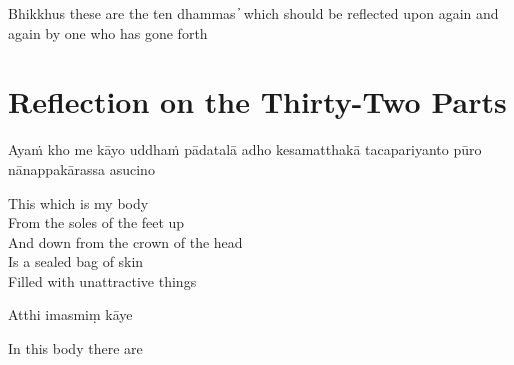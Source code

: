 \begin{english}
Bhikkhus these are the ten dhammas  ̓  which should be reflected upon again and again by one who has gone forth
\end{english}


\clearpage

\section{Reflection on the Thirty-Two Parts}

\begin{leader}
\end{leader}

Ayaṁ kho me kāyo uddhaṁ pādatalā adho kesamatthakā tacapariyanto pūro nānappakārassa asucino

\begin{english}
This which is my body\\
From the soles of the feet up\\
And down from the crown of the head\\
Is a sealed bag of skin\\
Filled with unattractive things
\end{english}

Atthi imasmiṃ kāye

\begin{english}
  In this body there are
\end{english}

